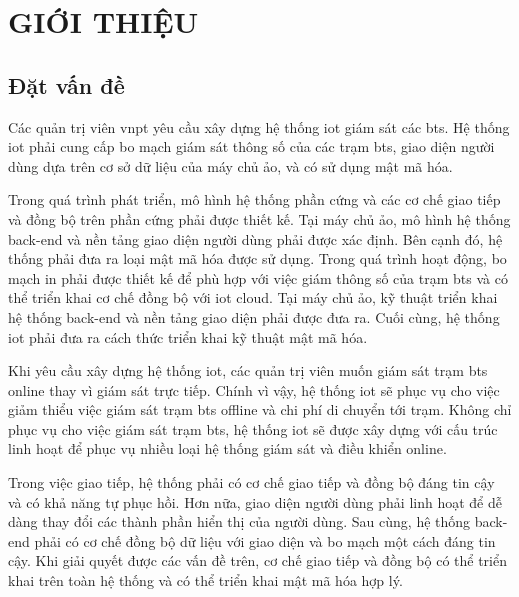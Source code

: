 \chapter{GIỚI THIỆU}
\label{Chapter1}

\section{Đặt vấn đề}

Các quản trị viên \acrfull{vnpt} yêu cầu xây dựng hệ thống \acrfull{iot} giám sát các \acrfull{bts}. Hệ thống \acrshort{iot} phải cung cấp bo mạch giám sát thông số của các trạm \acrshort{bts}, giao diện người dùng dựa trên cơ sở dữ liệu của máy chủ ảo, và có sử dụng mật mã hóa.

Trong quá trình phát triển, mô hình hệ thống phần cứng và các cơ chế giao tiếp và đồng bộ trên phần cứng phải được thiết kế. Tại máy chủ ảo, mô hình hệ thống back-end và nền tảng giao diện người dùng phải được xác định. Bên cạnh đó, hệ thống phải đưa ra loại mật mã hóa được sử dụng. Trong quá trình hoạt động, bo mạch in phải được thiết kế để phù hợp với việc giám thông số của trạm \acrshort{bts} và có thể triển khai cơ chế đồng bộ với \acrshort{iot} cloud. Tại máy chủ ảo, kỹ thuật triển khai hệ thống back-end và nền tảng giao diện phải được đưa ra. Cuối cùng, hệ thống \acrshort{iot} phải đưa ra cách thức triển khai kỹ thuật mật mã hóa.

Khi yêu cầu xây dựng hệ thống \acrshort{iot}, các quản trị viên muốn giám sát trạm \acrshort{bts} online thay vì giám sát trực tiếp. Chính vì vậy, hệ thống \acrshort{iot} sẽ phục vụ cho việc giảm thiểu việc giám sát trạm \acrshort{bts} offline và chi phí di chuyển tới trạm. 
Không chỉ phục vụ cho việc giám sát trạm \acrshort{bts}, hệ thống \acrshort{iot} sẽ được xây dựng với cấu trúc linh hoạt để phục vụ nhiều loại hệ thống giám sát và điều khiển online.

Trong việc giao tiếp, hệ thống phải có cơ chế giao tiếp và đồng bộ đáng tin cậy và có khả năng tự phục hồi. Hơn nữa, giao diện người dùng phải linh hoạt để dễ dàng thay đổi các thành phần hiển thị của người dùng. Sau cùng, hệ thống back-end phải có cơ chế đồng bộ dữ liệu với giao diện và bo mạch một cách đáng tin cậy. Khi giải quyết được các vấn đề trên, cơ chế giao tiếp và đồng bộ có thể triển khai trên toàn hệ thống và có thể triển khai mật mã hóa hợp lý.

